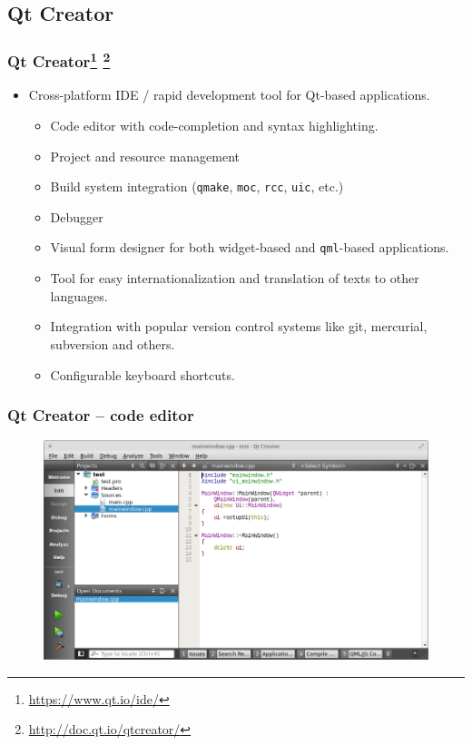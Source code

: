 \subsection{Qt Creator}

\begin{frame}
  \frametitle{Qt Creator\footnote
    {\url{https://www.qt.io/ide/}} \footnote{\url{http://doc.qt.io/qtcreator/}}}
  \small
  \begin{itemize}
    \item Cross-platform IDE / rapid development tool for Qt-based applications.
    \begin{itemize}
      \item Code editor with code-completion and syntax highlighting.
      \item Project and resource management
      \item Build system integration (\texttt{qmake}, \texttt{moc}, \texttt{rcc},
        \texttt{uic}, etc.)
      \item Debugger
      \item Visual form designer for both widget-based and \texttt{qml}-based
        applications.
      \item Tool for easy internationalization and translation of texts to
        other languages.
      \item Integration with popular version control systems like git, mercurial,
        subversion and others.
      \item Configurable keyboard shortcuts.
    \end{itemize}
  \end{itemize}
\end{frame}

\begin{frame}
  \frametitle{Qt Creator -- code editor}
    \begin{figure}[!t]
    \centering
    \includegraphics[width=\textwidth]{images/qt_creator1.png}
    \end{figure}
\end{frame}

